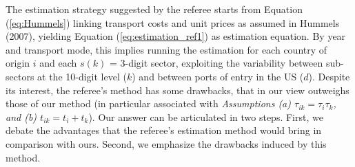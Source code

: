 \documentclass[a4paper,11pt]{article}
\begin{document}
The estimation strategy suggested by the referee starts from Equation (\ref{eq:Hummels}) linking transport costs and unit prices as assumed in Hummels (2007), yielding Equation (\ref{eq:estimation_ref1}) as estimation equation. By year and transport mode, this implies running the estimation for each country of origin $i$ and each $s(k)$ = 3-digit sector, exploiting the variability between sub-sectors at the 10-digit level ($k$) and between ports of entry in the US ($d$). Despite its interest, the referee's method has some drawbacks, that in our view outweighs those of our method (in particular associated with \textit{Assumptions (a) $\tau_{ik} = \tau_i\tau_{k}$, and (b) $t_{ik} = t_i+ t_{k}$}). Our answer can be articulated in two steps. First, we debate the advantages that the referee's estimation method would bring in comparison with ours. Second, we emphasize the drawbacks induced by this method. \smallskip
%
%
%
%
\end{document}
